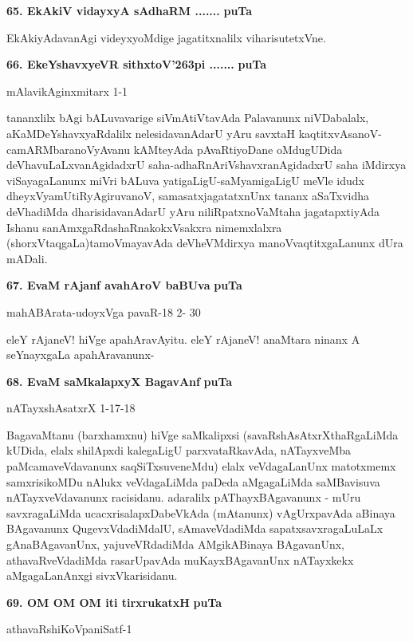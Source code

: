 \medskip
\noindent
\textbf{65. EkAkiV vidayxyA sAdhaRM .......} \hfill{\bf puTa \pageref{86}}

\smallskip
EkAkiyAdavanAgi videyxyoMdige jagatitxnalilx viharisutetxVne.

\eject

\noindent
\textbf{66. EkeYshavxyeVR sithxtoV\char'263pi .......} \hfill{\bf puTa \pageref{243}}

\hfill{mAlavikAginxmitarx 1-1}

\smallskip
tananxlilx bAgi bALuvavarige siVmAtiVtavAda Palavanunx niVDabalalx, aKaMDeY\-shavxyaRdalilx nelesi\-davanA\-darU yAru savxtaH kaqtitxvAsanoV-camARMbaranoV\break yAvanu kAMteyAda pAvaRti\-yoDane oMdu\-gUDida deVhavuLaLxvanAgidadxrU saha-adhaRnAriVshavxranAgidadxrU saha iMdirxya viSayagaLanunx \-miVri bALuva yatigaLigU-saMyamigaLigU meVle idudx dheyxVyamUtiRyAgiruvanoV, samasatx\break jaga\-tatx\-nUnx tananx aSaTxvidha deVhadiMda dharisidavanAdarU yAru niliRpatxnoV\break aMtaha jagatapxti\-yAda Ishanu sanAmxgaR\-dashaRnakokxVsakxra nimemxlalxra (shorxVtaqgaLa)\break tamoVmayavAda deVheVMdirxya manoVvaqtitx\-gaLanunx dUra mADali.


\medskip
\noindent
\textbf{67. EvaM rAjanf avahAroV baBUva} \hfill{\bf puTa \pageref{224}}

\hfill{mahABArata-udoyxVga pavaR-18 2- 30}

\smallskip
eleY rAjaneV! hiVge apahAravAyitu. eleY rAjaneV! anaMtara ninanx A seYnayxgaLa apahAravanunx-

\medskip
\noindent
\textbf{68. EvaM saMkalapxyX BagavAnf} \hfill{\bf puTa \pageref{242}}

\hfill{nATayxshAsatxrX 1-17-18}

\smallskip
BagavaMtanu (barxhamxnu) hiVge saMkalipxsi (savaRshAsAtxrXthaRgaLiMda kUDida, elalx shilApxdi kalegaLigU parxva\-taRkavAda, nATayxveMba paMcamaveVdavanunx saqSiTxsuve\-neMdu) elalx veVdagaLanUnx matotxmemx samxrisikoMDu nAlukx veVdagaLiMda paDeda aMgagaLiMda saMBavisuva nATayxveVdavanunx racisidanu. adaralilx pAThayxBAga\-vanunx - mUru savxra\-gaLiMda ucacxrisalapxDabeVkAda (mAtanunx) vAgUrxpavAda aBinaya BAgavanunx QugevxVdadiMdalU, sAmaveVdadiMda sapatxsavxragaLuLaLx gAnaBAgavanUnx, yajuveVRda\-diMda AMgikABi\-naya BAgavanUnx, athavaRveVdadiMda rasarUpavAda muKayx\-BAga\-vanUnx nATayxkekx aMgagaLanAnxgi sivxVkarisidanu.


\smallskip
\noindent
\textbf{69. OM OM OM iti tirxrukatxH} \hfill{\bf puTa \pageref{146}}

\hfill{athavaRshiKoVpaniSatf-1}

